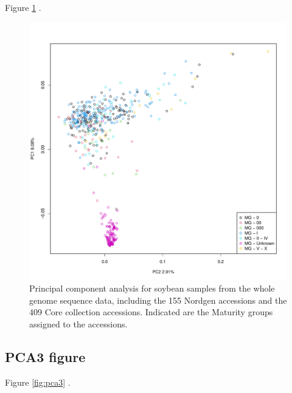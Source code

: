 \documentclass[9pt, onecolumn,twoside]{gsajnl}
\begin{document}
Figure \ref{fig:pca2} .

\begin{figure}[t]
\centering
\includegraphics[width=\linewidth]{plot_PCA_mg1.pdf}
\caption{Principal component analysis for soybean samples from the whole genome sequence data, including the 155 Nordgen accessions and the 409 Core collection accessions. Indicated are the Maturity groups assigned to the accessions.}
\label{fig:pca2}
\end{figure}


\subsection{PCA3 figure}


Figure \ref{fig:pca3} .
\end{document}
